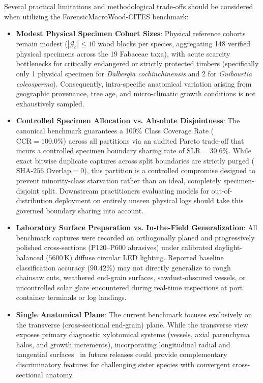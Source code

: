 \documentclass[a4paper,fleqn,12pt]{cas-sc}
\begin{document}
Several practical limitations and methodological trade-offs should be considered when utilizing the ForensicMacroWood-CITES benchmark:
\begin{itemize}[leftmargin=*,itemsep=2pt,topsep=2pt]
    \item \textbf{Modest Physical Specimen Cohort Sizes}: Physical reference cohorts remain modest ($|\mathcal{G}_c| \le 10$ wood blocks per species, aggregating 148 verified physical specimens across the 19 Fabaceae taxa), with acute scarcity bottlenecks for critically endangered or strictly protected timbers (specifically only 1 physical specimen for \textit{Dalbergia cochinchinensis} and 2 for \textit{Guibourtia coleosperma}). Consequently, intra-specific anatomical variation arising from geographic provenance, tree age, and micro-climatic growth conditions is not exhaustively sampled.
    \item \textbf{Controlled Specimen Allocation vs. Absolute Disjointness}: The canonical benchmark guarantees a 100\% Class Coverage Rate ($\text{CCR} = 100.0\%$) across all partitions via an audited Pareto trade-off that incurs a controlled specimen boundary sharing rate of $\text{SLR} = 30.6\%$. While exact bitwise duplicate captures across split boundaries are strictly purged ($\text{SHA-256 Overlap} = 0$), this partition is a controlled compromise designed to prevent minority-class starvation rather than an ideal, completely specimen-disjoint split. Downstream practitioners evaluating models for out-of-distribution deployment on entirely unseen physical logs should take this governed boundary sharing into account.
    \item \textbf{Laboratory Surface Preparation vs. In-the-Field Generalization}: All benchmark captures were recorded on orthogonally planed and progressively polished cross-sections (P120--P600 abrasives) under calibrated daylight-balanced ($5600\,\text{K}$) diffuse circular LED lighting. Reported baseline classification accuracy ($90.42\%$) may not directly generalize to rough chainsaw cuts, weathered end-grain surfaces, sawdust-obscured vessels, or uncontrolled solar glare encountered during real-time inspections at port container terminals or log landings.
    \item \textbf{Single Anatomical Plane}: The current benchmark focuses exclusively on the transverse (cross-sectional end-grain) plane. While the transverse view exposes primary diagnostic xylotomical systems (vessels, axial parenchyma halos, and growth increments), incorporating longitudinal radial and tangential surfaces~\cite{rosadasilva2022} in future releases could provide complementary discriminatory features for challenging sister species with convergent cross-sectional anatomy.
\end{itemize}
\end{document}
